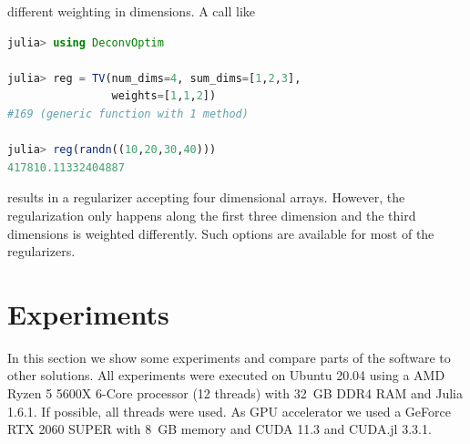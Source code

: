 \documentclass{juliacon}
\begin{document}
        different weighting in dimensions.
        A call like 
        \begin{lstlisting}[language = Julia]
julia> using DeconvOptim

julia> reg = TV(num_dims=4, sum_dims=[1,2,3],
                weights=[1,1,2])
#169 (generic function with 1 method)

julia> reg(randn((10,20,30,40)))
417810.11332404887
        \end{lstlisting}
        results in a regularizer accepting four dimensional arrays. However, the regularization only happens along the first three dimension
        and the third dimensions is weighted differently.
        Such options are available for most of the regularizers.

\section{Experiments}
    In this section we show some experiments and compare parts of the software to other solutions.
    All experiments were executed on Ubuntu 20.04 using a AMD Ryzen 5 5600X 6-Core processor (12 threads) with \SI{32}{GB} DDR4 RAM and Julia 1.6.1.
    If possible, all threads were used.
    As GPU accelerator we used a GeForce RTX 2060 SUPER with \SI{8}{GB} memory and CUDA 11.3 and CUDA.jl 3.3.1.
\end{document}
